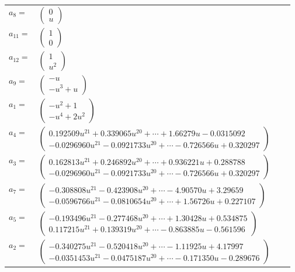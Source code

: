 \documentclass[1p]{elsarticle_modified}
\theoremstyle{definition}
\begin{document}
\begin{tabular}{m{7pt} m{180pt} m{7pt} m{180pt} }
\flushright $a_{8}=$&$\begin{pmatrix}0\\u\end{pmatrix}$ \\
\flushright $a_{11}=$&$\begin{pmatrix}1\\0\end{pmatrix}$ \\
\flushright $a_{12}=$&$\begin{pmatrix}1\\u^2\end{pmatrix}$ \\
\flushright $a_{9}=$&$\begin{pmatrix}- u\\- u^3+u\end{pmatrix}$ \\
\flushright $a_{1}=$&$\begin{pmatrix}- u^2+1\\- u^4+2 u^2\end{pmatrix}$ \\
\flushright $a_{4}=$&$\begin{pmatrix}0.192509 u^{21}+0.339065 u^{20}+\cdots+1.66279 u-0.0315092\\-0.0296960 u^{21}-0.0921733 u^{20}+\cdots-0.726566 u+0.320297\end{pmatrix}$ \\
\flushright $a_{3}=$&$\begin{pmatrix}0.162813 u^{21}+0.246892 u^{20}+\cdots+0.936221 u+0.288788\\-0.0296960 u^{21}-0.0921733 u^{20}+\cdots-0.726566 u+0.320297\end{pmatrix}$ \\
\flushright $a_{7}=$&$\begin{pmatrix}-0.308808 u^{21}-0.423908 u^{20}+\cdots-4.90570 u+3.29659\\-0.0596766 u^{21}-0.0810654 u^{20}+\cdots+1.56726 u+0.227107\end{pmatrix}$ \\
\flushright $a_{5}=$&$\begin{pmatrix}-0.193496 u^{21}-0.277468 u^{20}+\cdots+1.30428 u+0.534875\\0.117215 u^{21}+0.139319 u^{20}+\cdots-0.863885 u-0.561596\end{pmatrix}$ \\
\flushright $a_{2}=$&$\begin{pmatrix}-0.340275 u^{21}-0.520418 u^{20}+\cdots-1.11925 u+4.17997\\-0.0351453 u^{21}-0.0475187 u^{20}+\cdots-0.171350 u-0.289676\end{pmatrix}$ \\

\end{tabular}
\end{document}
